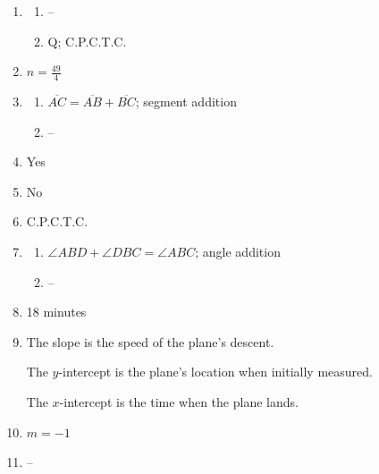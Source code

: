 \documentclass{article}
\begin{document}
\begin{enumerate}
\begin{enumerate}
	\item $y = -\frac{5}{4}(x - 2)$

	\end{enumerate}
	
\item
	\begin{enumerate}
	
	\item -- 
	
	\item Q; C.P.C.T.C.
	
	\end{enumerate}
	
\item $n = \frac{49}{4}$

\item
	\begin{enumerate} 
	
	\item $\overline{AC} = \overline{AB} + \overline{BC}$; segment addition
	
	\item --
	
	\end{enumerate}

\item Yes

\item No

\item C.P.C.T.C.

\item
	\begin{enumerate}
	
	\item $\angle ABD + \angle DBC = \angle ABC$; angle addition
	
	\item --
	
	\end{enumerate}

\item 18 minutes

\item The slope is the speed of the plane's descent.

	The $y$-intercept is the plane's location when initially measured.
	
	The $x$-intercept is the time when the plane lands.

\item $m = -1$

\item --


\end{enumerate}
\end{document}
